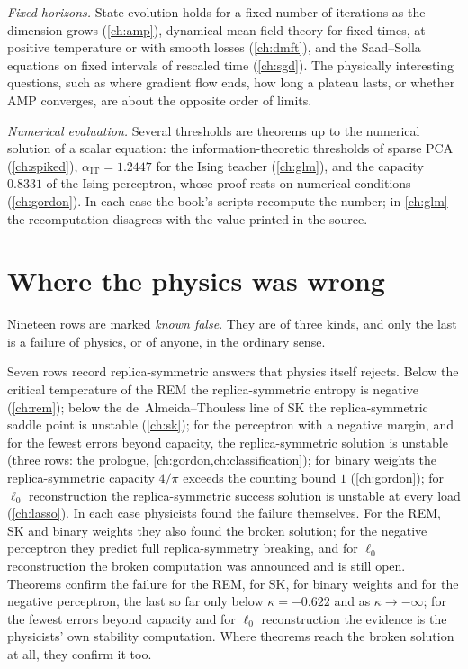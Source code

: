 \begin{refsection}
\emph{Fixed horizons.} State evolution holds for a fixed number of iterations as the dimension grows (\cref{ch:amp}), dynamical mean-field theory for fixed times, at positive temperature or with smooth losses (\cref{ch:dmft}), and the Saad--Solla equations on fixed intervals of rescaled time (\cref{ch:sgd}). The physically interesting questions, such as where gradient flow ends, how long a plateau lasts, or whether AMP converges, are about the opposite order of limits.

\emph{Numerical evaluation.} Several thresholds are theorems up to the numerical solution of a scalar equation: the information-theoretic thresholds of sparse PCA (\cref{ch:spiked}), $\alpha_{\mathrm{IT}}=1.2447$ for the Ising teacher (\cref{ch:glm}), and the capacity $0.8331$ of the Ising perceptron, whose proof rests on numerical conditions (\cref{ch:gordon}). In each case the book's scripts recompute the number; in \cref{ch:glm} the recomputation disagrees with the value printed in the source.

\section*{Where the physics was wrong}

Nineteen rows are marked \emph{known false}. They are of three kinds, and only the last is a failure of physics, or of anyone, in the ordinary sense.

Seven rows record replica-symmetric answers that physics itself rejects. Below the critical temperature of the REM the replica-symmetric entropy is negative (\cref{ch:rem}); below the de~Almeida--Thouless line of SK the replica-symmetric saddle point is unstable (\cref{ch:sk}); for the perceptron with a negative margin, and for the fewest errors beyond capacity, the replica-symmetric solution is unstable (three rows: the prologue, \cref{ch:gordon,ch:classification}); for binary weights the replica-symmetric capacity $4/\pi$ exceeds the counting bound $1$ (\cref{ch:gordon}); for $\ell_0$ reconstruction the replica-symmetric success solution is unstable at every load (\cref{ch:lasso}). In each case physicists found the failure themselves. For the REM, SK and binary weights they also found the broken solution; for the negative perceptron they predict full replica-symmetry breaking, and for $\ell_0$ reconstruction the broken computation was announced and is still open. Theorems confirm the failure for the REM, for SK, for binary weights and for the negative perceptron, the last so far only below $\kappa=-0.622$ and as $\kappa\to-\infty$; for the fewest errors beyond capacity and for $\ell_0$ reconstruction the evidence is the physicists' own stability computation. Where theorems reach the broken solution at all, they confirm it too.


\end{refsection}
